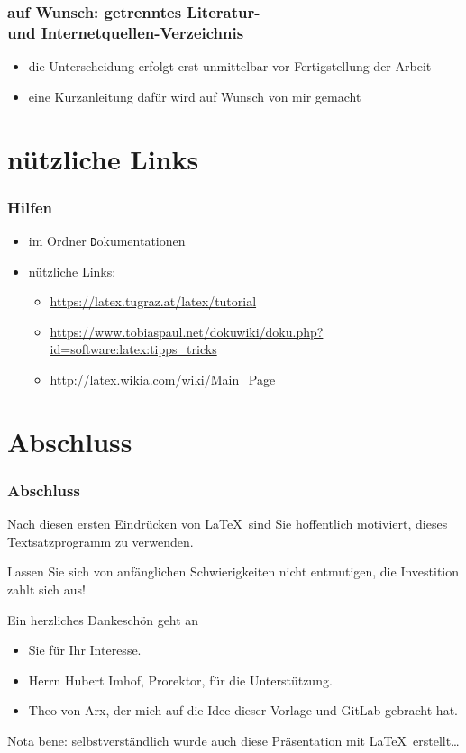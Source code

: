 \documentclass[11pt,german]{beamer}
\def\myColor{blue!80!white!70!green}                %
\newcommand{\thisColor}[1]{{\color{\myColor}#1}}    %
\newcommand{\tinyurl}[1]{{\tiny{\url{#1}}}}
\begin{document}
\frame
{
	\frametitle{auf Wunsch: getrenntes Literatur- \\und Internetquellen-Verzeichnis}
	\begin{itemize}
		\item die Unterscheidung erfolgt erst unmittelbar vor Fertigstellung der Arbeit
		\item eine Kurzanleitung dafür wird auf Wunsch von mir gemacht
	\end{itemize}
}

\section{nützliche Links}
\frame
{
	\frametitle{Hilfen}
	\begin{itemize}
		\item 	im Ordner {\texttt Dokumentationen}\\
	\item nützliche Links:
	\begin{itemize}
		\item \tinyurl{https://latex.tugraz.at/latex/tutorial}
		\item \tinyurl{https://www.tobiaspaul.net/dokuwiki/doku.php?id=software:latex:tipps_tricks}
		\item \tinyurl{http://latex.wikia.com/wiki/Main_Page}
	\end{itemize}
	\end{itemize}
	
}
\section{Abschluss}

\frame
{
	\frametitle{Abschluss}
Nach diesen ersten Eindrücken von \LaTeX\ sind Sie hoffentlich motiviert, dieses Textsatzprogramm zu verwenden.

Lassen Sie sich von anfänglichen Schwierigkeiten nicht entmutigen, die Investition zahlt sich aus!

\vspace{2ex}
\thisColor{Ein herzliches Dankeschön geht an}
	\begin{itemize}
		\item Sie für Ihr Interesse.
		\item Herrn Hubert Imhof, Prorektor, für die Unterstützung.
		\item Theo von Arx, der mich auf die Idee dieser Vorlage und GitLab gebracht hat.
	\end{itemize}

\vfill
{\tiny
Nota bene: selbstverständlich wurde auch diese Präsentation mit \LaTeX\ erstellt\dots
}
}
\end{document}
